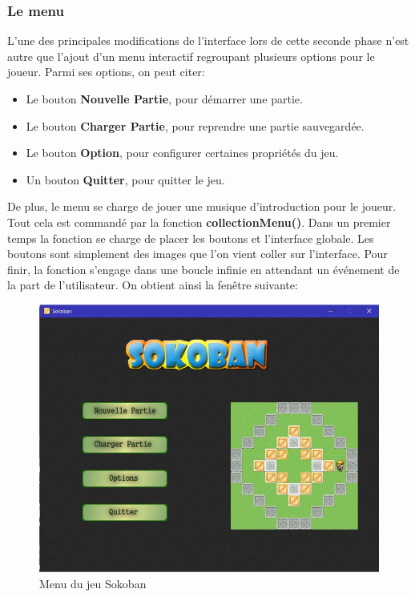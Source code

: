 \documentclass{article}
\begin{document}
			\subsubsection{Le menu}
	L'une des principales modifications de l'interface lors de cette seconde phase n'est autre que l'ajout d'un menu interactif regroupant plusieurs options pour le joueur. Parmi ses options, on peut citer:
\begin{itemize}
\item Le bouton \textbf{Nouvelle Partie}, pour démarrer une partie.
\item Le bouton \textbf{Charger Partie}, pour reprendre une partie sauvegardée.
\item Le bouton \textbf{Option}, pour configurer certaines propriétés du jeu.
\item Un bouton \textbf{Quitter}, pour quitter le jeu.
\end{itemize}
De plus, le menu se charge de jouer une musique d'introduction pour le joueur. Tout cela est commandé par la fonction \textbf{collectionMenu()}. \newline
Dans un premier temps la fonction se charge de placer les boutons et l'interface globale. Les boutons sont simplement des images que l'on vient coller sur l'interface. Pour finir, la fonction s'engage dans une boucle infinie en attendant un événement de la part de l'utilisateur. On obtient ainsi la fenêtre suivante: 
\begin{figure}[!h]
\centering
\includegraphics[scale=0.5]{img/menu-interface.jpg}
\caption{Menu du jeu Sokoban}
\end{figure}
\newline
\end{document}
